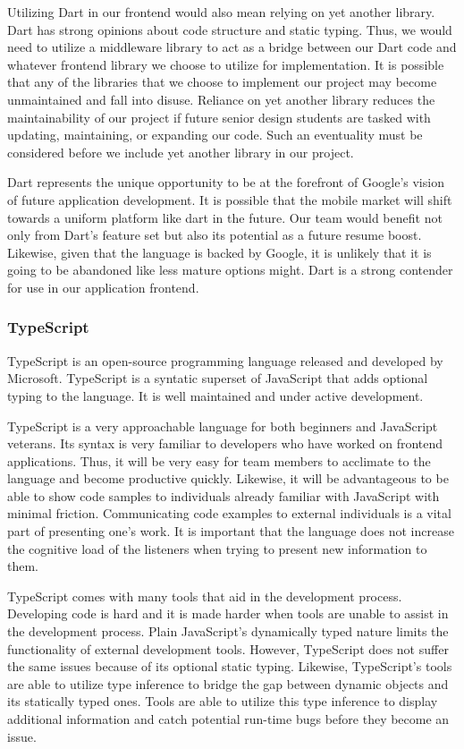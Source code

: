 \documentclass[12pt]{report}
\begin{document}
Utilizing Dart in our frontend would also mean relying on yet another library. Dart has strong opinions about code structure and static typing. Thus, we would need to utilize a middleware library to act as a bridge between our Dart code and whatever frontend library we choose to utilize for implementation. It is possible that any of the libraries that we choose to implement our project may become unmaintained and fall into disuse. Reliance on yet another library reduces the maintainability of our project if future senior design students are tasked with updating, maintaining, or expanding our code. Such an eventuality must be considered before we include yet another library in our project.

Dart represents the unique opportunity to be at the forefront of Google's vision of future application development. It is possible that the mobile market will shift towards a uniform platform like dart in the future. Our team would benefit not only from Dart's feature set but also its potential as a future resume boost. Likewise, given that the language is backed by Google, it is unlikely that it is going to be abandoned like less mature options might. Dart is a strong contender for use in our application frontend.

\subsubsection*{TypeScript}

TypeScript is an open-source programming language released and developed by Microsoft. TypeScript is a syntatic superset of JavaScript that adds optional typing to the language.\cite{typescripthomepage} It is well maintained and under active development.

TypeScript is a very approachable language for both beginners and JavaScript veterans. Its syntax is very familiar to developers who have worked on frontend applications. Thus, it will be very easy for team members to acclimate to the language and become productive quickly. Likewise, it will be advantageous to be able to show code samples to individuals already familiar with JavaScript with minimal friction. Communicating code examples to external individuals is a vital part of presenting one's work. It is important that the language does not increase the cognitive load of the listeners when trying to present new information to them.

TypeScript comes with many tools that aid in the development process. Developing code is hard and it is made harder when tools are unable to assist in the development process. Plain JavaScript's dynamically typed nature limits the functionality of external development tools. However, TypeScript does not suffer the same issues because of its optional static typing. Likewise, TypeScript's tools are able to utilize type inference to bridge the gap between dynamic objects and its statically typed ones.\cite{typescripthomepage} Tools are able to utilize this type inference to display additional information and catch potential run-time bugs before they become an issue.
\end{document}
